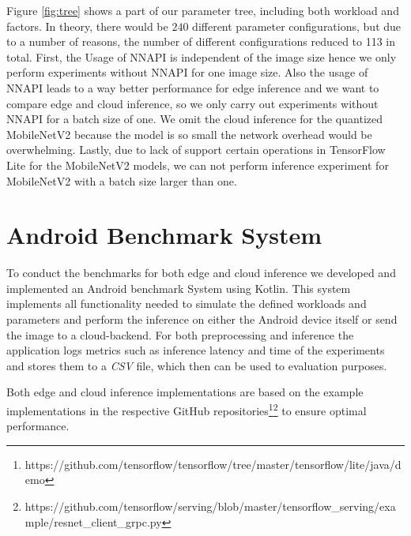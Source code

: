 \vspace{15pt}
Figure \ref{fig:tree} shows a part of our parameter tree, including both workload and factors. In theory, there would be $240$ different parameter configurations, but due to a number of reasons, the number of different configurations reduced to 113 in total.
First, the Usage of NNAPI is independent of the image size hence we only perform experiments without NNAPI for one image size. Also the usage of NNAPI leads to a way better performance for edge inference and we want to compare edge and cloud inference, so we only carry out experiments without NNAPI for a batch size of one.
We omit the cloud inference for the quantized MobileNetV2 because the model is so small the network overhead would be overwhelming.
Lastly, due to lack of support certain operations in TensorFlow Lite for the MobileNetV2 models, we can not perform inference experiment for MobileNetV2 with a batch size larger than one.

\section{Android Benchmark System}
\label{chap:androidApp}
To conduct the benchmarks for both edge and cloud inference we developed and implemented an Android benchmark System using Kotlin.
This system implements all functionality needed to simulate the defined workloads and parameters and perform the inference on either the Android device itself or send the image to a cloud-backend.
For both preprocessing and inference the application logs metrics such as inference latency and time of the experiments and stores them to a \emph{CSV} file, which then can be used to evaluation purposes.

Both edge and cloud inference implementations are based on the example implementations in the respective GitHub repositories\footnote{https://github.com/tensorflow/tensorflow/tree/master/tensorflow/lite/java/demo}\footnote{https://github.com/tensorflow/serving/blob/master/tensorflow\_serving/example/resnet\_client\_grpc.py} to ensure optimal performance. 


